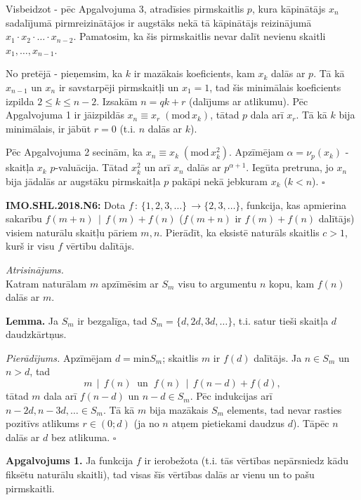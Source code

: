 \documentclass[11pt]{article}
\newenvironment{uzdevums}[1][\unskip]{%
\vspace{3mm}
\noindent
\textbf{#1:}
\noindent}
{}
\begin{document}
Visbeidzot - pēc Apgalvojuma 3, atradīsies pirmskaitlis $p$, 
kura kāpinātājs $x_n$ sadalījumā pirmreizinātājos ir augstāks 
nekā tā kāpinātājs  reizinājumā $x_1 \cdot x_2 \cdot \ldots \cdot x_{n-2}$. 
Pamatosim, ka šis pirmskaitlis nevar dalīt nevienu skaitli 
$x_1,\ldots,x_{n-1}$. 

No pretējā - pieņemsim, ka $k$ ir mazākais koeficients, kam $x_k$ dalās ar $p$.
Tā kā $x_{n-1}$ un $x_n$ ir savstarpēji pirmskaitļi un $x_1=1$, tad 
šis minimālais koeficients izpilda $2 \leq k \leq n-2$. Izsakām 
$n = qk+r$ (dalījums ar atlikumu). Pēc Apgalvojuma 1 
ir jāizpildās $x_n \equiv x_r\;(\mbox{mod}\,x_k)$, tātad
$p$ dala arī $x_r$. Tā kā $k$ bija minimālais, ir jābūt $r=0$
(t.i. $n$ dalās ar $k$). 

Pēc Apgalvojuma 2 secinām, ka $x_n \equiv x_k\;(\mbox{mod}\,x_k^2)$. 
Apzīmējam $\alpha = \nu_p(x_k)$ - skaitļa $x_k$ $p$-valuācija. 
Tātad $x_k^2$ un arī $x_n$ dalās ar $p^{\alpha+1}$. Iegūta 
pretruna, jo $x_n$ bija jādalās ar augstāku pirmskaitļa $p$ pakāpi 
nekā jebkuram $x_k$ ($k<n$). $\square$


\newpage

\begin{uzdevums}[IMO.SHL.2018.N6]
Dota $f\,:\,\{1,2,3,\ldots\}\,\rightarrow\{2,3,\ldots\}$, 
funkcija, kas apmierina sakarību
$f(m+n)\,\mid\,f(m)+f(n)$ ($f(m+n)$ ir $f(m)+f(n)$ dalītājs)
visiem naturālu skaitļu pāriem $m,n$. Pierādīt, ka 
eksistē naturāls skaitlis $c>1$, kurš ir visu 
$f$ vērtību dalītājs.
\end{uzdevums}

{\em Atrisinājums.}\\
Katram naturālam $m$ apzīmēsim ar $S_m$ visu to argumentu $n$ kopu, 
kam $f(n)$ dalās ar $m$. 

{\bf Lemma.} Ja $S_m$ ir bezgalīga, tad $S_m = \{ d, 2d, 3d,\ldots\}$, 
t.i. satur tieši skaitļa $d$ daudzkārtņus.

{\em Pierādījums.} Apzīmējam $d = \mbox{min} S_m$; skaitlis $m$ ir $f(d)$ 
dalītājs. Ja $n \in S_m$ un $n > d$, tad 
$$m\,\mid\,f(n)\;\;\mbox{un}\;\;f(n)\,\mid\,f(n-d) + f(d),$$
tātad $m$ dala arī $f(n-d)$ un $n-d \in S_m$. Pēc indukcijas arī
$n-2d, n-3d,\ldots \in S_m$. Tā kā $m$ bija mazākais $S_m$ elements, 
tad nevar rasties pozitīvs atlikums $r\in (0;d)$ (ja no $n$ atņem 
pietiekami daudzus $d$). Tāpēc $n$ dalās ar $d$ bez atlikuma. $\square$


{\bf Apgalvojums 1.} Ja funkcija $f$ ir ierobežota (t.i. 
tās vērtības nepārsniedz kādu fiksētu naturālu skaitli), tad
visas šīs vērtības dalās ar vienu un to pašu pirmskaitli. 
\end{document}
